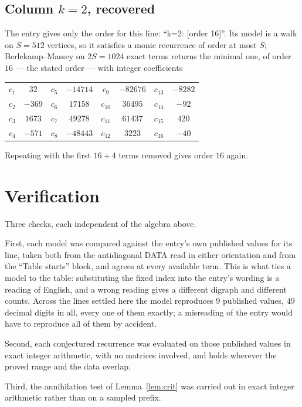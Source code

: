 \documentclass[11pt,a4paper]{article}
\theoremstyle{plain}
\theoremstyle{definition}
\begin{document}
\subsection*{Column $k=2$, recovered}
The entry gives only the order for this line: ``k=2: [order 16]''. Its model is a walk on
$S=512$ vertices, so it satisfies a monic recurrence of order at most $S$;
Berlekamp--Massey on $2S=1024$ exact terms returns the minimal one, of order
$16$ --- the stated order --- with integer coefficients
\begin{center}\small\begin{tabular}{cccccccc}
$c_{1}$ & $32$ & $c_{5}$ & $-14714$ & $c_{9}$ & $-82676$ & $c_{13}$ & $-8282$ \\
$c_{2}$ & $-369$ & $c_{6}$ & $17158$ & $c_{10}$ & $36495$ & $c_{14}$ & $-92$ \\
$c_{3}$ & $1673$ & $c_{7}$ & $49278$ & $c_{11}$ & $61437$ & $c_{15}$ & $420$ \\
$c_{4}$ & $-571$ & $c_{8}$ & $-48443$ & $c_{12}$ & $3223$ & $c_{16}$ & $-40$ \\
\end{tabular}\end{center}
Repeating with the first $16+4$ terms removed gives order $16$ again.

\section{Verification}

Three checks, each independent of the algebra above.

First, each model was compared against the entry's own published values for its line, taken
both from the antidiagonal DATA read in either orientation and from the ``Table starts''
block, and agrees at every available term. This is what ties a model to the table:
substituting the fixed index into the entry's wording is a reading of English, and a wrong
reading gives a different digraph and different counts. Across the lines settled here the
model reproduces $9$ published values, $49$ decimal digits in all, every one of
them exactly; a misreading of the entry would have to reproduce all of them by accident.

Second, each conjectured recurrence was evaluated on those published values in exact
integer arithmetic, with no matrices involved, and holds wherever the proved range and the
data overlap.

Third, the annihilation test of Lemma~\ref{lem:crit} was carried out in exact integer
arithmetic rather than on a sampled prefix.
\end{document}
